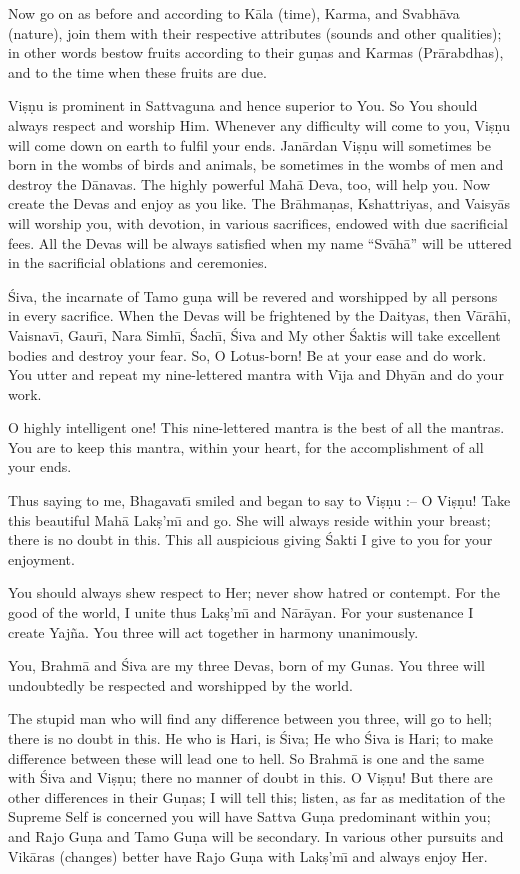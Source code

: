 Now go on as before and according to K\=ala (time), Karma, and Svabh\=ava (nature), join them with their respective attributes (sounds and other qualities); in other words bestow fruits according to their gu\d{n}as and Karmas (Pr\=arabdhas), and to the time when these fruits are due.

Vi\d{s}\d{n}u is prominent in Sattvaguna and hence superior to You. So You should always respect and worship Him. Whenever any difficulty will come to you, Vi\d{s}\d{n}u will come down on earth to fulfil your ends. Jan\=ardan Vi\d{s}\d{n}u will sometimes be born in the wombs of birds and animals, be sometimes in the wombs of men and destroy the D\=anavas. The highly powerful Mah\=a Deva, too, will help you. Now create the Devas and enjoy as you like. The Br\=ahma\d{n}as, Kshattriyas, and Vaisy\=as will worship you, with devotion, in various sacrifices, endowed with due sacrificial fees. All the Devas will be always satisfied when my name ``Sv\=ah\=a'' will be uttered in the sacrificial oblations and ceremonies.

\'Siva, the incarnate of Tamo gu\d{n}a will be revered and worshipped by all persons in every sacrifice. When the Devas will be frightened by the Daityas, then V\=ar\=ah\={\i}, Vaisnav\={\i}, Gaur\={\i}, Nara Simh\={\i}, \'Sach\={\i}, \'Siva and My other \'Saktis will take excellent bodies and destroy your fear. So, O Lotus-born! Be at your ease and do work. You utter and repeat my nine-lettered mantra with V\={\i}ja and Dhy\=an and do your work.

O highly intelligent one! This nine-lettered mantra is the best of all the mantras. You are to keep this mantra, within your heart, for the accomplishment of all your ends.

Thus saying to me, Bhagavat\={\i} smiled and began to say to Vi\d{s}\d{n}u :-- O Vi\d{s}\d{n}u! Take this beautiful Mah\=a Lak\d{s}'m\={\i} and go. She will always reside within your breast; there is no doubt in this. This all auspicious giving \'Sakti I give to you for your enjoyment.

You should always shew respect to Her; never show hatred or contempt. For the good of the world, I unite thus Lak\d{s}'m\={\i} and N\=ar\=ayan. For your sustenance I create Yaj\~na. You three will act together in harmony unanimously.

You, Brahm\=a and \'Siva are my three Devas, born of my Gunas. You three will undoubtedly be respected and worshipped by the world.

The stupid man who will find any difference between you three, will go to hell; there is no doubt in this. He who is Hari, is \'Siva; He who \'Siva is Hari; to make difference between these will lead one to hell. So Brahm\=a is one and the same with \'Siva and Vi\d{s}\d{n}u; there no manner of doubt in this. O Vi\d{s}\d{n}u! But there are other differences in their Gu\d{n}as; I will tell this; listen, as far as meditation of the Supreme Self is concerned you will have Sattva Gu\d{n}a predominant within you; and Rajo Gu\d{n}a and Tamo Gu\d{n}a will be secondary. In various other pursuits and Vik\=aras (changes) better have Rajo Gu\d{n}a with Lak\d{s}'m\={\i} and always enjoy Her.

